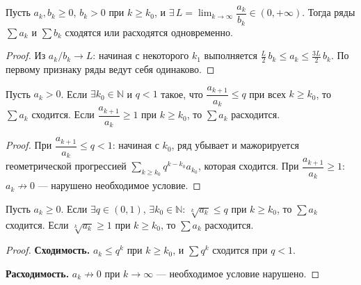\begin{theorem}
  Пусть $a_k, b_k \geq 0$, $b_k > 0$ при $k \geq k_0$, и $\exists\, L = \lim_{k\to\infty} \dfrac{a_k}{b_k} \in (0, +\infty)$.
  Тогда ряды $\sum a_k$ и $\sum b_k$ сходятся или расходятся одновременно.
  \begin{proof}
    Из $a_k/b_k \to L$: начиная с некоторого $k_1$ выполняется
    $\tfrac{L}{2}\,b_k \leq a_k \leq \tfrac{3L}{2}\,b_k$.
    По первому признаку ряды ведут себя одинаково. \qedhere
  \end{proof}
\end{theorem}

\begin{theorem}
  Пусть $a_k > 0$. Если $\exists k_0 \in \mathbb{N}$ и $q < 1$ такое, что
  $\dfrac{a_{k+1}}{a_k} \leq q$ при всех $k \geq k_0$, то $\sum a_k$ сходится.
  Если $\dfrac{a_{k+1}}{a_k} \geq 1$ при $k \geq k_0$, то $\sum a_k$ расходится.
  \begin{proof}
    При $\dfrac{a_{k+1}}{a_k} \leq q < 1$: начиная с $k_0$, ряд убывает и мажорируется
    геометрической прогрессией $\sum_{k \geq k_0} q^{k-k_0} a_{k_0}$, которая сходится.
    При $\dfrac{a_{k+1}}{a_k} \geq 1$: $a_k \not\to 0$ --- нарушено необходимое условие. \qedhere
  \end{proof}
\end{theorem}

\begin{theorem}
  Пусть $a_k \geq 0$. Если $\exists q \in (0,1)$, $\exists k_0 \in \mathbb{N}$:
  $\sqrt[k]{a_k} \leq q$ при $k \geq k_0$, то $\sum a_k$ сходится.
  Если $\sqrt[k]{a_k} \geq 1$ при $k \geq k_0$, то $\sum a_k$ расходится.
  \begin{proof}
    \textbf{Сходимость.} $a_k \leq q^k$ при $k \geq k_0$, и $\sum q^k$ сходится при $q < 1$.
    
    \textbf{Расходимость.} $a_k \not\to 0$ при $k \to \infty$ --- необходимое условие нарушено. \qedhere
  \end{proof}
\end{theorem}
